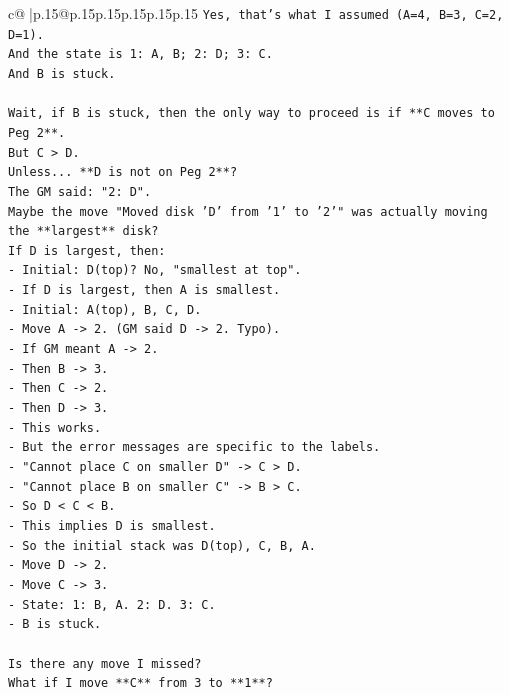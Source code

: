 \documentclass{article}
\begin{document}
{\begin{supertabular}{c@{$\;$}|p{.15\linewidth}@{}p{.15\linewidth}p{.15\linewidth}p{.15\linewidth}p{.15\linewidth}p{.15\linewidth}}
{{{\texttt{Yes, that's what I assumed (A=4, B=3, C=2, D=1).} \\
\texttt{And the state is 1: A, B; 2: D; 3: C.} \\
\texttt{And B is stuck.} \\
\\ 
\texttt{Wait, if B is stuck, then the only way to proceed is if **C moves to Peg 2**.} \\
\texttt{But C > D.} \\
\texttt{Unless... **D is not on Peg 2**?} \\
\texttt{The GM said: "2: D".} \\
\texttt{Maybe the move "Moved disk 'D' from '1' to '2'" was actually moving the **largest** disk?} \\
\texttt{If D is largest, then:} \\
\texttt{{-} Initial: D(top)? No, "smallest at top".} \\
\texttt{{-} If D is largest, then A is smallest.} \\
\texttt{{-} Initial: A(top), B, C, D.} \\
\texttt{{-} Move A {-}> 2. (GM said D {-}> 2. Typo).} \\
\texttt{{-} If GM meant A {-}> 2.} \\
\texttt{{-} Then B {-}> 3.} \\
\texttt{{-} Then C {-}> 2.} \\
\texttt{{-} Then D {-}> 3.} \\
\texttt{{-} This works.} \\
\texttt{{-} But the error messages are specific to the labels.} \\
\texttt{{-} "Cannot place C on smaller D" {-}> C > D.} \\
\texttt{{-} "Cannot place B on smaller C" {-}> B > C.} \\
\texttt{{-} So D < C < B.} \\
\texttt{{-} This implies D is smallest.} \\
\texttt{{-} So the initial stack was D(top), C, B, A.} \\
\texttt{{-} Move D {-}> 2.} \\
\texttt{{-} Move C {-}> 3.} \\
\texttt{{-} State: 1: B, A. 2: D. 3: C.} \\
\texttt{{-} B is stuck.} \\
\\ 
\texttt{Is there any move I missed?} \\
\texttt{What if I move **C** from 3 to **1**?} \\
}}}
\end{supertabular}}
\end{document}
